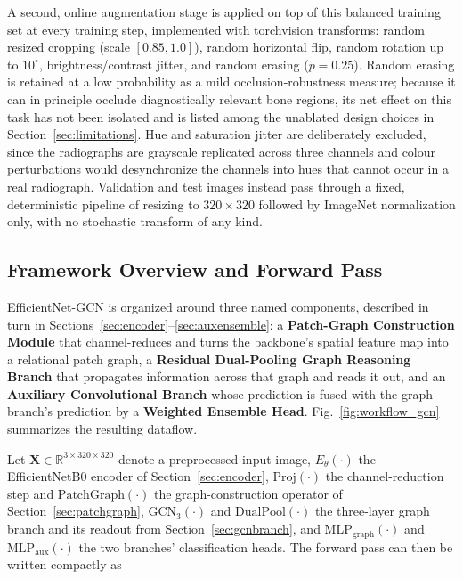 \documentclass[journal]{IEEEtran}
\begin{document}
A second, online augmentation stage is applied on top of this balanced training
set at every training step, implemented with torchvision transforms: random
resized cropping (scale $[0.85,1.0]$), random horizontal flip, random rotation
up to $10^{\circ}$, brightness/contrast jitter, and random erasing ($p=0.25$).
Random erasing is retained at a low probability as a mild occlusion-robustness
measure; because it can in principle occlude diagnostically relevant bone
regions, its net effect on this task has not been isolated and is listed among
the unablated design choices in Section~\ref{sec:limitations}. Hue and
saturation jitter are deliberately excluded, since the radiographs are grayscale
replicated across three channels and colour perturbations would desynchronize
the channels into hues that cannot occur in a real radiograph. Validation and
test images instead pass through a fixed, deterministic pipeline of resizing to
$320\times320$ followed by ImageNet normalization only, with no stochastic
transform of any kind.

\subsection{Framework Overview and Forward Pass}
\label{sec:overview}
EfficientNet-GCN is organized around three named components, described in turn
in Sections~\ref{sec:encoder}--\ref{sec:auxensemble}: a \textbf{Patch-Graph
Construction Module} that channel-reduces and turns the backbone's spatial
feature map into a relational patch graph, a \textbf{Residual Dual-Pooling Graph
Reasoning Branch} that propagates information across that graph and reads it
out, and an \textbf{Auxiliary Convolutional Branch} whose prediction is fused
with the graph branch's prediction by a \textbf{Weighted Ensemble Head}.
Fig.~\ref{fig:workflow_gcn} summarizes the resulting dataflow.

Let $\mathbf{X} \in \mathbb{R}^{3\times320\times320}$ denote a preprocessed input
image, $E_{\theta}(\cdot)$ the EfficientNetB0 encoder of
Section~\ref{sec:encoder}, $\mathrm{Proj}(\cdot)$ the channel-reduction step and
$\mathrm{PatchGraph}(\cdot)$ the graph-construction operator of
Section~\ref{sec:patchgraph}, $\mathrm{GCN}_3(\cdot)$ and
$\mathrm{DualPool}(\cdot)$ the three-layer graph branch and its readout from
Section~\ref{sec:gcnbranch}, and $\mathrm{MLP}_{\text{graph}}(\cdot)$ and
$\mathrm{MLP}_{\text{aux}}(\cdot)$ the two branches' classification heads. The
forward pass can then be written compactly as
\end{document}
